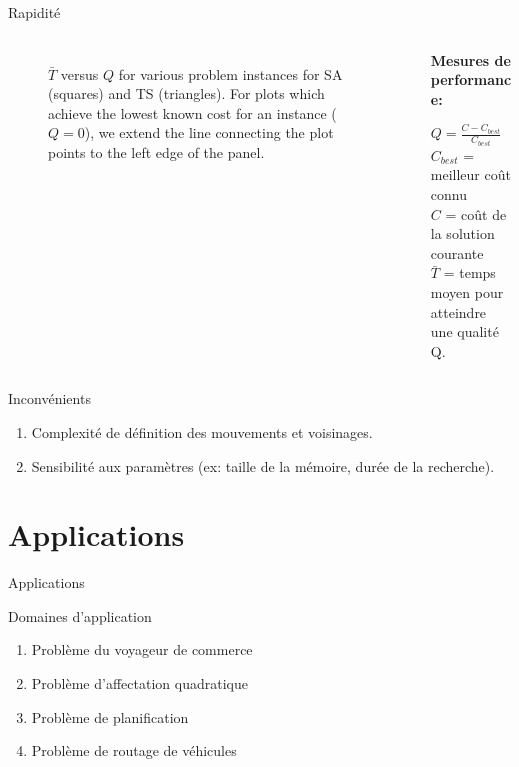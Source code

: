 \documentclass[10pt, handout]{beamer}
\begin{document}
\begin{frame}{Rapidité}
\begin{columns}
\begin{column}{0.6\textwidth}
\begin{figure}[ht]
\begin{center}
\begin{tabular}{cc}
                    \end{tabular}
                \end{center}
                \caption{$\bar T$ versus $Q$ for various problem instances for SA (squares) and TS (triangles).  For plots which
                    achieve the lowest known cost for an instance ($Q=0$), we extend the
                    line connecting the plot points to the left edge of the panel.}
                \label{pCRo}
            \end{figure}
        \end{column}
        \begin{column}{0.4\textwidth}

            \textbf{Mesures de performance:}
            \medskip

            $Q = \frac{C - C_{best}}{C_{best}}$ \\
            $C_{best}$ = meilleur coût connu \\
            $C$ = coût de la solution courante \\
            $\bar T$ = temps moyen pour atteindre une qualité Q.
        \end{column}
    \end{columns}
\end{frame}

\begin{frame}{Inconvénients}
    \begin{enumerate}
        \item Complexité de définition des mouvements et voisinages.
        \item Sensibilité aux paramètres (ex: taille de la mémoire, durée de la recherche).
    \end{enumerate}

\end{frame}


\section{Applications}
\begin{frame}{Applications}
    \begin{alertblock}{Domaines d'application}
        \begin{enumerate}
            \item Problème du voyageur de commerce
            \item Problème d'affectation quadratique
            \item Problème de planification
            \item Problème de routage de véhicules
        \end{enumerate}
    \end{alertblock}
\end{frame}
\end{document}
